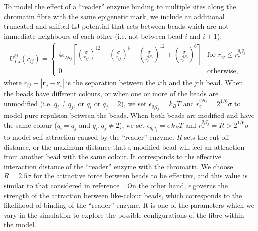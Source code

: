 \documentclass[12pt]{article}
\newcommand{\abs}[1]{\left|#1\right|}
\begin{document}
To model the effect of a ``reader'' enzyme binding to multiple sites along the chromatin fibre with the same epigenetic mark, we include an additional truncated and shifted LJ potential that acts between beads which are not immediate neighbours of each other (i.e. not between bead $i$ and $i+1$):
\begin{eqnarray}
U_{LJ}^{ij}(r_{ij}) = \left\{ 
	\begin{array}{ll}
	4\epsilon_{q_iq_j} \left[ \left(\frac{\sigma}{r_{ij}}\right)^{12}-\left(\frac{\sigma}{r_{ij}}\right)^{6}-\left(\frac{\sigma}{r_c^{q_iq_j}}\right)^{12}+\left(\frac{\sigma}{r_c^{q_iq_j}}\right)^{6}\right] & \textrm{for $r_{ij} \le r_c^{q_iq_j}$}\\
	0 & \textrm{otherwise},
	\end{array}
\right.
\end{eqnarray}
where $r_{ij} \equiv \abs{\bm{r}_j - \bm{r}_i}$ is the separation between the $i$th and the $j$th bead. When the beads have different colours, or when one or more of the beads are unmodified (i.e. $q_i \neq q_j$, or $q_i$ or $q_j = 2$), we set $\epsilon_{q_iq_j} = k_BT$ and $r_c^{q_iq_j} = 2^{1/6}\sigma$ to model pure repulsion between the beads. When both beads are modified and have the same colour ($q_i = q_j$ and $q_i, q_j \neq 2$), we set $\epsilon_{q_iq_j}= \epsilon\,k_BT$ and $r_c^{q_iq_j} = R > 2^{1/6}\sigma$ to model self-attraction caused by the ``reader'' enzyme. $R$ sets the cut-off distance, or the maximum distance that a modified bead will feel an attraction from another bead with the same colour. It corresponds to the effective interaction distance of the ``reader'' enzyme with the chromatin. We choose $R = 2.5\sigma$ for the attractive force between beads to be effective, and this value is similar to that considered in reference~\cite{michieletto2016}. On the other hand, $\epsilon$ governs the strength of the attraction between like-colour beads, which corresponds to the likelihood of binding of the ``reader'' enzyme. It is one of the parameters which we vary in the simulation to explore the possible configurations of the fibre within the model.
\end{document}
